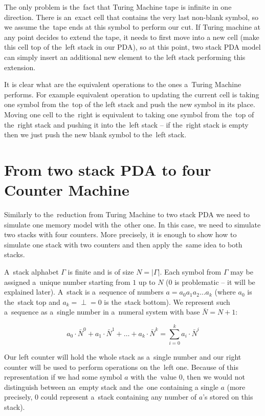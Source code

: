 \documentclass[english,shortabstract,mgr]{iithesis}
\begin{document}
The only problem is the~fact that Turing Machine tape is infinite in one direction.
There is an~exact cell that contains the very last non-blank symbol, so we assume the~tape
ends at this symbol to perform our cut. If Turing machine at any point decides to extend
the tape, it needs to first move into a new cell (make this cell top of the~left stack in our PDA),
so at this point, two stack PDA model can simply insert an additional new element to the left
stack performing this extension.

It is clear what are the equivalent operations to the ones a~Turing Machine performs.
For example equivalent operation to updating the current cell is taking one symbol from
the~top of the left stack and push the new symbol in its place. Moving one cell to the~right
is equivalent to taking one symbol from the~top of the~right stack and pushing it
into the~left stack -- if the~right stack is empty then we just push the new blank symbol
to the~left stack.

\section {From two stack PDA to four Counter Machine}

Similarly to the~reduction from Turing Machine to two stack PDA we need to simulate
one memory model with the~other one. In this case, we need to simulate two stacks
with four counters. More precisely, it is enough to show how to simulate one stack
with two counters and then apply the~same idea to both stacks.

A~stack alphabet $\Gamma$ is finite and is of size $N = |\Gamma|$. Each symbol from $\Gamma$ may
be assigned a~unique number starting from $1$ up to $N$ ($0$ is problematic -- it will be
explained later). A~stack is a~sequence of numbers $a = a_0 a_1 a_2 \dots a_{k}$ (where $a_0$
is the~stack top and $a_k = \perp = 0$ is the~stack bottom). We represent such
a~sequence as a~single number in a~numeral system with base $\bar{N} = N+1$:

$$ a_0 \cdot \bar{N}^0 + a_1 \cdot \bar{N}^1 + \dots + a_{k} \cdot \bar{N}^{k}
    = \sum_{i=0}^{k} a_i \cdot \bar{N}^i $$

Our left counter will hold the whole stack as a~single number and our right counter will be used
to perform operations on the~left one. Because of this representation if we had some symbol $a$
with the~value $0$, then we would not distinguish between an~empty stack and the~one containing
a single $a$ (more precisely, $0$ could represent a~stack containing any number of $a$'s
stored on this stack).
\end{document}
